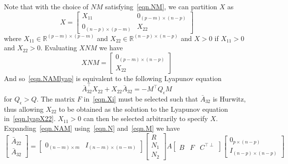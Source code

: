 \documentclass[]{../sty/aiaa-tc}
\begin{document}
  Note that with the choice of $NM$ satisfying\ \eqref{eqn.NM}, we can partition $X$ as
  \begin{equation}
    \label{eqn.Xpartition}
    X=
    \begin{bmatrix}
      X_{11} & 0_{(p-m)\times(n-p)} \\
      0_{(n-p)\times(p-m)} & X_{22}
    \end{bmatrix}
  \end{equation}
  where $X_{11}\in\mathbb{R}^{(p-m)\times(p-m)}$ and $X_{22}\in\mathbb{R}^{(n-p)\times(n-p)}$ and $X>0$ if $X_{11}>0$ and $X_{22}>0$.
  Evaluating $XNM$ we have
  \begin{equation*}
    XNM=
    \begin{bmatrix}
      0_{(p-m)\times(n-p)} \\
      X_{22}
    \end{bmatrix}
  \end{equation*}
  And so\ \eqref{eqn.NAMlyap} is equivalent to the following Lyapunov equation
  \begin{equation}
    \label{eqn.lyapX22}
    \bar{A}_{32}^{\top}X_{22}+X_{22}\bar{A}_{32}=-M^{\top}Q_{\epsilon}M
  \end{equation}
  for $Q_{\epsilon}>Q$.
  The matrix $F$ in\ \eqref{eqn.Xi} must be selected such that $\bar{A}_{32}$ is Hurwitz, thus allowing $X_{22}$ to be obtained as the solution to the Lyapunov equation in\ \eqref{eqn.lyapX22}.
  $X_{11}>0$ can then be selected arbitrarily to specify $X$.
  Expanding\ \eqref{eqn.NAM} using\ \eqref{eqn.N} and\ \eqref{eqn.M} we have
  \begin{equation*}
    \begin{bmatrix}
      \bar{A}_{22} \\
      \bar{A}_{32}
    \end{bmatrix}=
    \begin{bmatrix}
      0_{(n-m)\times m} & I_{(n-m)\times(n-m)}
    \end{bmatrix}
    \begin{bmatrix}
      R \\
      N_{1} \\
      N_{2}
    \end{bmatrix}
    A
    \begin{bmatrix}
      B & F & C^{\top\perp}
    \end{bmatrix}
    \begin{bmatrix}
      0_{p\times(n-p)} \\
      I_{(n-p)\times(n-p)}
    \end{bmatrix}
  \end{equation*}
\end{document}
